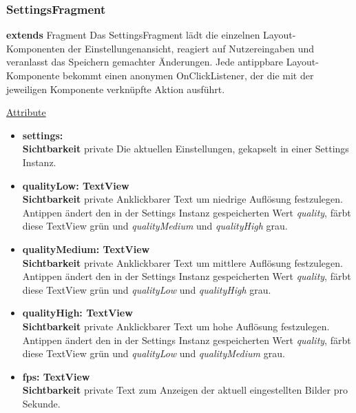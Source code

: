 \subsubsection{SettingsFragment} \label{app:klasse:SettingsFragment}
\textbf{extends} Fragment \newline
Das SettingsFragment lädt die einzelnen Layout-Komponenten der Einstellungenansicht, reagiert auf Nutzereingaben und veranlasst das Speichern gemachter Änderungen. Jede antippbare Layout-Komponente bekommt einen anonymen OnClickListener, der die mit der jeweiligen Komponente verknüpfte Aktion ausführt.
\newline

\underline{Attribute}
\begin{itemize}
\itemsep0pt
\item \textbf{settings:  } \hfill\\ 
\textbf{Sichtbarkeit} private \newline
Die aktuellen Einstellungen, gekapselt in einer Settings Instanz.

\item \textbf{qualityLow: TextView} \hfill\\ 
\textbf{Sichtbarkeit} private \newline
Anklickbarer Text um niedrige Auflösung festzulegen. Antippen ändert den in der Settings Instanz gespeicherten Wert \textit{quality}, färbt diese TextView grün und \textit{qualityMedium} und \textit{qualityHigh} grau.

\item \textbf{qualityMedium: TextView} \hfill\\ 
\textbf{Sichtbarkeit} private \newline
Anklickbarer Text um mittlere Auflösung festzulegen. Antippen ändert den in der Settings Instanz gespeicherten Wert \textit{quality}, färbt diese TextView grün und \textit{qualityLow} und \textit{qualityHigh} grau.

\item \textbf{qualityHigh: TextView} \hfill\\ 
\textbf{Sichtbarkeit} private \newline
Anklickbarer Text um hohe Auflösung festzulegen. Antippen ändert den in der Settings Instanz gespeicherten Wert \textit{quality}, färbt diese TextView grün und \textit{qualityLow} und \textit{qualityMedium} grau.

\item \textbf{fps: TextView} \hfill\\ 
\textbf{Sichtbarkeit} private \newline
Text zum Anzeigen der aktuell eingestellten Bilder pro Sekunde.


\end{itemize}
